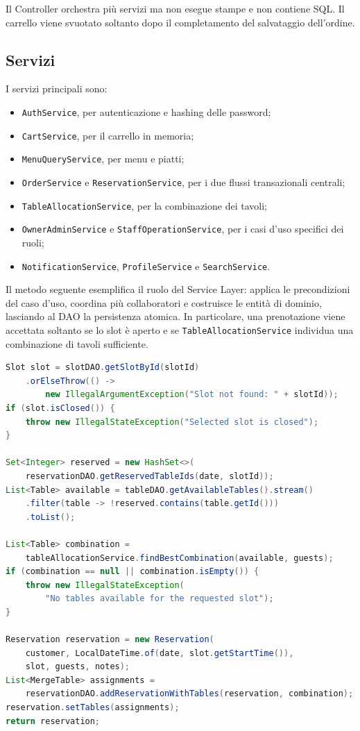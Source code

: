 \documentclass[12pt,a4paper]{article}
\newcommand{\code}[1]{\nolinkurl{#1}}
\begin{document}
Il Controller orchestra più servizi ma non esegue stampe e non contiene SQL.
Il carrello viene svuotato soltanto dopo il completamento del salvataggio
dell'ordine.

\subsection{Servizi}

I servizi principali sono:

\begin{itemize}[leftmargin=*]
  \item \code{AuthService}, per autenticazione e hashing delle password;
  \item \code{CartService}, per il carrello in memoria;
  \item \code{MenuQueryService}, per menu e piatti;
  \item \code{OrderService} e \code{ReservationService}, per i due flussi
        transazionali centrali;
  \item \code{TableAllocationService}, per la combinazione dei tavoli;
  \item \code{OwnerAdminService} e \code{StaffOperationService}, per i casi
        d'uso specifici dei ruoli;
  \item \code{NotificationService}, \code{ProfileService} e
         \code{SearchService}.
\end{itemize}

Il metodo seguente esemplifica il ruolo del Service Layer: applica le
precondizioni del caso d'uso, coordina più collaboratori e costruisce le entità
di dominio, lasciando al DAO la persistenza atomica. In particolare, una
prenotazione viene accettata soltanto se lo slot è aperto e se
\code{TableAllocationService} individua una combinazione di tavoli sufficiente.

\begin{lstlisting}[style=codeStyle,language=Java,
caption={Coordinamento della creazione di una prenotazione nel Service Layer.}]
Slot slot = slotDAO.getSlotById(slotId)
    .orElseThrow(() ->
        new IllegalArgumentException("Slot not found: " + slotId));
if (slot.isClosed()) {
    throw new IllegalStateException("Selected slot is closed");
}

Set<Integer> reserved = new HashSet<>(
    reservationDAO.getReservedTableIds(date, slotId));
List<Table> available = tableDAO.getAvailableTables().stream()
    .filter(table -> !reserved.contains(table.getId()))
    .toList();

List<Table> combination =
    tableAllocationService.findBestCombination(available, guests);
if (combination == null || combination.isEmpty()) {
    throw new IllegalStateException(
        "No tables available for the requested slot");
}

Reservation reservation = new Reservation(
    customer, LocalDateTime.of(date, slot.getStartTime()),
    slot, guests, notes);
List<MergeTable> assignments =
    reservationDAO.addReservationWithTables(reservation, combination);
reservation.setTables(assignments);
return reservation;
\end{lstlisting}
\end{document}
